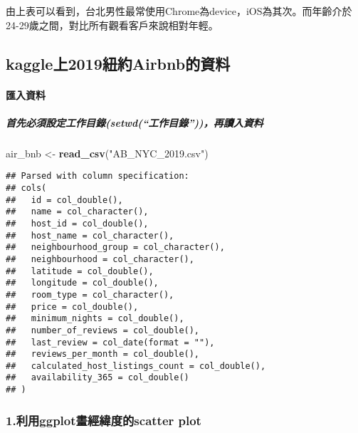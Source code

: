 \documentclass[]{article}
\newenvironment{Shaded}{\begin{snugshade}}{\end{snugshade}}
\newcommand{\KeywordTok}[1]{\textcolor[rgb]{0.13,0.29,0.53}{\textbf{#1}}}
\newcommand{\NormalTok}[1]{#1}
\newcommand{\StringTok}[1]{\textcolor[rgb]{0.31,0.60,0.02}{#1}}
\let\oldparagraph\paragraph
\renewcommand{\paragraph}[1]{\oldparagraph{#1}\mbox{}}
\let\oldsubparagraph\subparagraph
\renewcommand{\subparagraph}[1]{\oldsubparagraph{#1}\mbox{}}
\begin{document}
由上表可以看到，台北男性最常使用Chrome為device，iOS為其次。而年齡介於24-29歲之間，對比所有觀看客戶來說相對年輕。

\hypertarget{kaggleux4e0a2019ux7d10ux7d04airbnbux7684ux8cc7ux6599}{%
\subsection{\texorpdfstring{\textbf{kaggle上2019紐約Airbnb的資料}}{kaggle上2019紐約Airbnb的資料}}\label{kaggleux4e0a2019ux7d10ux7d04airbnbux7684ux8cc7ux6599}}

\hypertarget{ux532fux5165ux8cc7ux6599-1}{%
\paragraph{匯入資料}\label{ux532fux5165ux8cc7ux6599-1}}

\hypertarget{ux9996ux5148ux5fc5ux9808ux8a2dux5b9aux5de5ux4f5cux76eeux9304setwdux5de5ux4f5cux76eeux9304ux518dux8b80ux5165ux8cc7ux6599-1}{%
\subparagraph{首先必須設定工作目錄(setwd(``工作目錄''))，再讀入資料}\label{ux9996ux5148ux5fc5ux9808ux8a2dux5b9aux5de5ux4f5cux76eeux9304setwdux5de5ux4f5cux76eeux9304ux518dux8b80ux5165ux8cc7ux6599-1}}

\begin{Shaded}
\begin{Highlighting}[]
\NormalTok{air_bnb <-}\StringTok{ }\KeywordTok{read_csv}\NormalTok{(}\StringTok{"AB_NYC_2019.csv"}\NormalTok{)}
\end{Highlighting}
\end{Shaded}

\begin{verbatim}
## Parsed with column specification:
## cols(
##   id = col_double(),
##   name = col_character(),
##   host_id = col_double(),
##   host_name = col_character(),
##   neighbourhood_group = col_character(),
##   neighbourhood = col_character(),
##   latitude = col_double(),
##   longitude = col_double(),
##   room_type = col_character(),
##   price = col_double(),
##   minimum_nights = col_double(),
##   number_of_reviews = col_double(),
##   last_review = col_date(format = ""),
##   reviews_per_month = col_double(),
##   calculated_host_listings_count = col_double(),
##   availability_365 = col_double()
## )
\end{verbatim}

\hypertarget{ux5229ux7528ggplotux756bux7d93ux7defux5ea6ux7684scatter-plot}{%
\subsubsection{\texorpdfstring{\textbf{1.利用ggplot畫經緯度的scatter
plot}}{1.利用ggplot畫經緯度的scatter plot}}\label{ux5229ux7528ggplotux756bux7d93ux7defux5ea6ux7684scatter-plot}}
\end{document}

